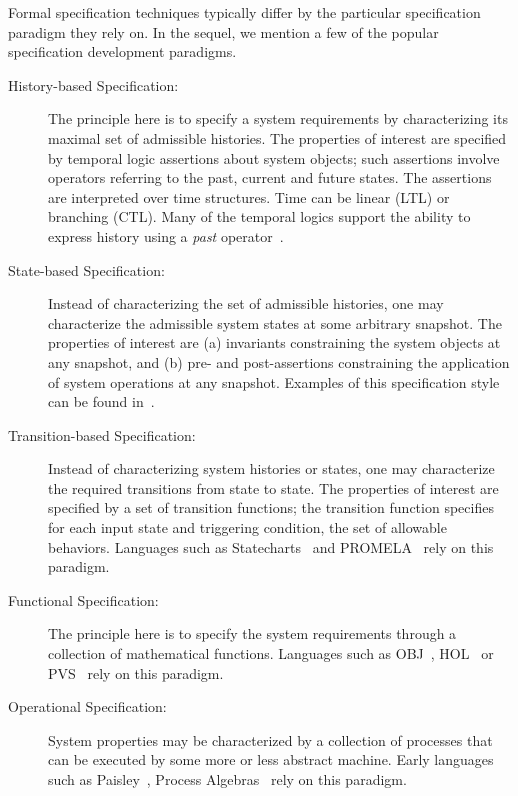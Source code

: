\noindent
Formal specification techniques typically differ by the particular
specification paradigm they rely on. In the sequel, we mention a few
of the popular specification development paradigms.

\begin{description}

\item [History-based Specification:] The principle here is to specify
    a system requirements by characterizing its maximal set of
    admissible histories. The properties of interest are specified
    by temporal logic assertions about system objects; such assertions
    involve operators referring to the past, current and future states.
    The assertions are interpreted over time structures. Time can
    be linear (LTL) or branching (CTL). Many of the temporal logics
    support the ability to express history using a {\em past}
    operator~\cite{ltlp}.

\item [State-based Specification:] Instead of characterizing the set
    of admissible histories, one may characterize the admissible system
    states at some arbitrary snapshot. The properties of interest are
    (a) invariants constraining the system objects at any snapshot, and
    (b) pre- and post-assertions constraining the application of
    system operations at any snapshot. Examples of this specification 
	style can be found in~\cite{Abr80, Abr96, gurevich, dill:00, dill:01}.

\item [Transition-based Specification:] Instead of characterizing
    system histories or states, one may characterize the required
    transitions from state to state. The properties of interest are
    specified by a set of transition functions; the transition
    function specifies for each input state and triggering condition,
    the set of allowable behaviors. Languages such as Statecharts~\cite{uml} 
	and PROMELA~\cite{spin} rely on this paradigm.

\item [Functional Specification:] The principle here is to specify the
    system requirements through a collection of mathematical functions.
    Languages such as OBJ~\cite{fut95}, HOL~\cite{gor93} or
    PVS~\cite{cro95} rely on this paradigm.

\item [Operational Specification:] System properties may be characterized by
    a collection of processes that can be executed by some more or
    less abstract machine. Early languages such as Paisley~\cite{zav82},
    Process Algebras~\cite{Hoa85} rely on this paradigm. 

\end{description}

